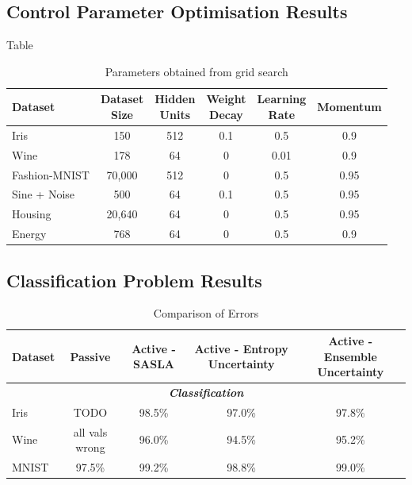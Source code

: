 \documentclass[10pt, conference]{IEEEtran}
\begin{document}
\subsection{Control Parameter Optimisation Results}
Table 
\begin{table}[htbp]
	\centering
	\caption{Parameters obtained from grid search}
	\begin{tabular}{|l|c|c|c|c|c|}
		\hline
		\textbf{Dataset} & \makecell{\textbf{Dataset} \\ \textbf{Size}} & \makecell{\textbf{Hidden} \\ \textbf{Units}} & \makecell{\textbf{Weight} \\ \textbf{Decay}} & \makecell{\textbf{Learning} \\ \textbf{Rate}} & \textbf{Momentum} \\
		\hline
		Iris & 150 & 512 & 0.1 & 0.5 & 0.9 \\
		Wine & 178 & 64 & 0 & 0.01 & 0.9 \\
		Fashion-MNIST & 70,000 & 512 & 0 & 0.5 & 0.95 \\
		\hline
		Sine + Noise & 500 & 64 & 0.1 & 0.5 & 0.95 \\
		Housing & 20,640 & 64 & 0 & 0.5 & 0.95 \\
		Energy & 768 & 64 & 0 & 0.5 & 0.9 \\
		\hline
	\end{tabular}
	\label{tab:datasets}
\end{table}






\subsection{Classification Problem Results}
\begin{table}[ht]
	\caption{Comparison of Errors}
	\label{tab:comparison}
	\centering
	\begin{tabular}{|l|c|c|c|c|}
		\hline
		\textbf{Dataset} & \textbf{Passive} & \textbf{Active - SASLA} & \textbf{Active - Entropy Uncertainty} & \textbf{Active - Ensemble Uncertainty} \\
		\hline
		\multicolumn{5}{|c|}{\textbf{\textit{Classification}}} \\
		\hline
		Iris & TODO & 98.5\% & 97.0\% & 97.8\% \\
		Wine & all vals wrong & 96.0\% & 94.5\% & 95.2\% \\
		MNIST & 97.5\% & 99.2\% & 98.8\% & 99.0\% \\
		\hline
	\end{tabular}
\end{table}
\end{document}
